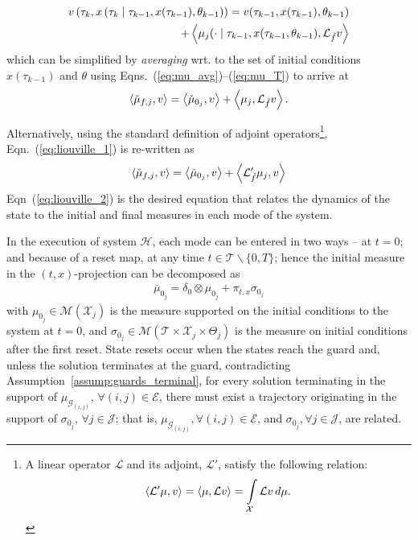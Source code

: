 \small
\begin{align}
\begin{split}
    v\left(\tau_k,x\left(\tau_{k}\mid \tau_{k-1},x(\tau_{k-1}),\theta_{k-1}\right)\right)=v(\tau_{k-1},x(\tau_{k-1}),\theta_{k-1})\\
    +\left\langle \mu_j(\cdot\mid \tau_{k-1},x(\tau_{k-1},\theta_{k-1}),\mathcal L_{\tilde f}v\right\rangle
\end{split}
\end{align}
\normalsize
which can be simplified by \emph{averaging} wrt. to the set of initial conditions $x(\tau_{k-1})$ and $\theta$ using Eqns.~(\ref{eq:mu_avg})--(\ref{eq:mu_T}) to arrive at
\begin{align}
  \left\langle \check\mu_{f,j},v\right\rangle=\left\langle \check\mu_{0_j},v\right\rangle+\left\langle \mu_{j},\mathcal L_{\tilde f}v\right\rangle.
  \label{eq:liouville_1}
\end{align}
\par
Alternatively, using the standard definition of adjoint operators\footnote{A linear operator $\mathcal L$ and its adjoint, $\mathcal L'$, satisfy the following relation:
\begin{align*}
    \left\langle \mathcal L'\mu,v\right\rangle=\left\langle \mu,\mathcal Lv\right\rangle=\int\limits_{\mathcal X}\mathcal Lv\,d\mu.
\end{align*}}, Eqn.~(\ref{eq:liouville_1}) is re-written as
\begin{align}
\left\langle \check\mu_{f,j},v\right\rangle=\left\langle \check\mu_{0_j},v\right\rangle+\left\langle \mathcal L'_{\tilde f}\mu_{j},v\right\rangle
  \label{eq:liouville_2}
\end{align}
Eqn~(\ref{eq:liouville_2}) is the desired equation that relates the dynamics of the state to the initial and final measures in each mode of the system.
\par
In the execution of system $\mathcal H$, each mode can be entered in two ways -- at $t=0$; and because of a reset map, at any time $t\in \mathcal T\backslash\{0,T\}$; hence the initial measure in the $(t,x)$-projection can be decomposed as
\begin{align}
  \bar\mu_{0_j}=\delta_0\otimes\mu_{0_j}+\pi_{t,x}\sigma_{0_j}
\end{align}
with $\mu_{0_j}\in \mathcal M(\mathcal X_j)$ is the measure supported on the initial conditions to the system at $t=0$, and $\sigma_{0_j}\in \mathcal M(\mathcal T\times \mathcal X_j\times \Theta_j)$ is the measure on initial conditions after the first reset. State resets occur when the states reach the guard and, unless the solution terminates at the guard, contradicting Assumption~\ref{assump:guards_terminal}, for every solution terminating in the support of $\mu_{\mathcal G_{(i,j)}},\,\forall (i,j)\in \mathcal E$, there must exist a trajectory originating in the support of $\sigma_{0_j},\,\forall j\in \mathcal J$; that is, $\mu_{\mathcal G_{(i,j)}},\forall (i,j)\in \mathcal E$, and $\sigma_{0_j},\forall j\in \mathcal J$, are related.

